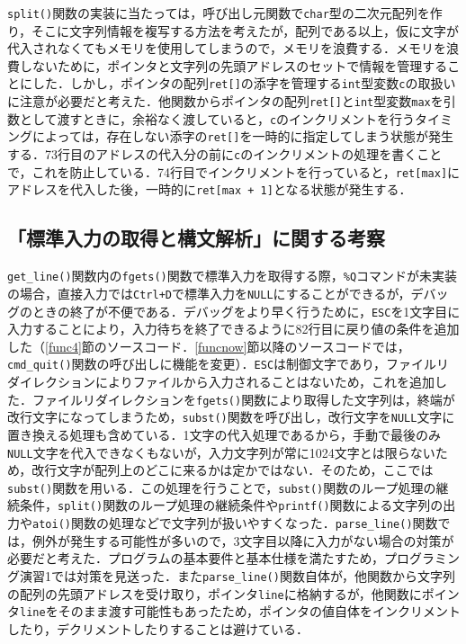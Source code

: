 \verb|split()|関数の実装に当たっては，呼び出し元関数で\verb|char|型の二次元配列を作り，そこに文字列情報を複写する方法を考えたが，配列である以上，仮に文字が代入されなくてもメモリを使用してしまうので，メモリを浪費する．メモリを浪費しないために，ポインタと文字列の先頭アドレスのセットで情報を管理することにした．しかし，ポインタの配列\verb|ret[]|の添字を管理する\verb|int|型変数\verb|c|の取扱いに注意が必要だと考えた．他関数からポインタの配列\verb|ret[]|と\verb|int|型変数\verb|max|を引数として渡すときに，余裕なく渡していると，\verb|c|のインクリメントを行うタイミングによっては，存在しない添字の\verb|ret[]|を一時的に指定してしまう状態が発生する．73行目のアドレスの代入分の前に\verb|c|のインクリメントの処理を書くことで，これを防止している．74行目でインクリメントを行っていると，\verb|ret[max]|にアドレスを代入した後，一時的に\verb|ret[max + 1]|となる状態が発生する．

\subsection{「標準入力の取得と構文解析」に関する考察}

\verb|get_line()|関数内の\verb|fgets()|関数で標準入力を取得する際，\verb|%Q|コマンドが未実装の場合，直接入力では\verb|Ctrl+D|で標準入力を\verb|NULL|にすることができるが，デバッグのときの終了が不便である．デバッグをより早く行うために，\verb|ESC|を1文字目に入力することにより，入力待ちを終了できるように82行目に戻り値の条件を追加した（\ref{func4}節のソースコード．\ref{funcnow}節以降のソースコードでは，\verb|cmd_quit()|関数の呼び出しに機能を変更）．\verb|ESC|は制御文字であり，ファイルリダイレクションによりファイルから入力されることはないため，これを追加した\cite{www:label2}．ファイルリダイレクションを\verb|fgets()|関数により取得した文字列は，終端が改行文字になってしまうため，\verb|subst()|関数を呼び出し，改行文字を\verb|NULL|文字に置き換える処理も含めている．1文字の代入処理であるから，手動で最後のみ\verb|NULL|文字を代入できなくもないが，入力文字列が常に1024文字とは限らないため，改行文字が配列上のどこに来るかは定かではない．そのため，ここでは\verb|subst()|関数を用いる．この処理を行うことで，\verb|subst()|関数のループ処理の継続条件，\verb|split()|関数のループ処理の継続条件や\verb|printf()|関数による文字列の出力や\verb|atoi()|関数の処理などで文字列が扱いやすくなった．\verb|parse_line()|関数では，例外が発生する可能性が多いので，3文字目以降に入力がない場合の対策が必要だと考えた．プログラムの基本要件と基本仕様を満たすため，プログラミング演習1では対策を見送った．また\verb|parse_line()|関数自体が，他関数から文字列の配列の先頭アドレスを受け取り，ポインタ\verb|line|に格納するが，他関数にポインタ\verb|line|をそのまま渡す可能性もあったため，ポインタの値自体をインクリメントしたり，デクリメントしたりすることは避けている．

